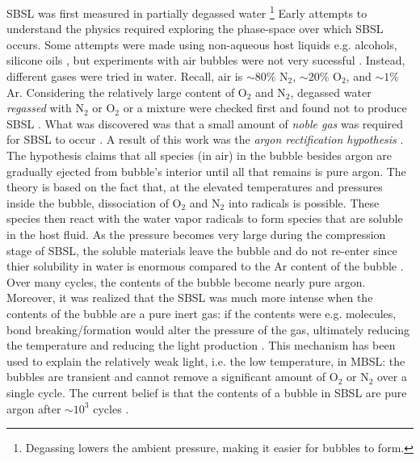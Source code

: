 \documentclass[rmp,aps,nofootinbib,superscriptaddress,floatfix]{revtex4-2}
\begin{document}
SBSL was first measured in partially degassed water \cite{gaitan1990experimental,gaitan1992sonoluminescence,brenner2002single} \footnote{Degassing lowers the ambient pressure, making it easier for bubbles to form.} Early attempts to understand the physics required exploring the phase-space over which SBSL occurs. Some attempts were made using non-aqueous host liquids e.g. alcohols, silicone oils \cite{weninger1995sonoluminescence,barber1997defining}, but experiments with air bubbles were not very sucessful \cite{barber1997defining}. Instead, different gases were tried in water. Recall, air is $\sim 80\%$ N$_2$, $\sim 20\%$ O$_2$, and $\sim 1\% $ Ar. Considering the relatively large content of O$_2$ and N$_2$, degassed water \emph{regassed} with N$_2$ or O$_2$ or a mixture were checked first and found not to produce SBSL \cite{hiller1994effect}. What was discovered was that a small amount of \emph{noble gas} was required for SBSL to occur \cite{barber1997defining,hiller1994effect,brenner2002single}. A result of this work was the \emph{argon rectification hypothesis} \cite{lohse1997sonoluminescing,brenner2002single,yasui2018acoustic,suslick2008inside}. The hypothesis claims that all species (in air) in the bubble besides argon are gradually ejected from bubble's interior until all that remains is pure argon. The theory is based on the fact that, at the elevated temperatures and pressures inside the bubble, dissociation of O$_2$ and N$_2$ into radicals is possible. These species then react with the water vapor radicals to form species that are soluble in the host fluid. As the pressure becomes very large during the compression stage of SBSL, the soluble materials leave the bubble and do not re-enter since thier solubility in water is enormous compared to the Ar content of the bubble \cite{lohse1997sonoluminescing}. Over many cycles, the contents of the bubble become nearly pure argon. Moreover, it was realized that the SBSL was much more intense when the contents of the bubble are a pure inert gas: if the contents were e.g. molecules, bond breaking/formation would alter the pressure of the gas, ultimately reducing the temperature and reducing the light production \cite{brenner2002single,yasui2018acoustic,lohse2018bubble,suslick2008inside}. This mechanism has been used to explain the relatively weak light, i.e. the low temperature, in MBSL: the bubbles are transient and cannot remove a significant amount of O$_2$ or N$_2$ over a single cycle. The current belief is that the contents of a bubble in SBSL are pure argon after $\sim 10^3$ cycles \cite{brenner2002single,yasui2018acoustic}. 
\end{document}
